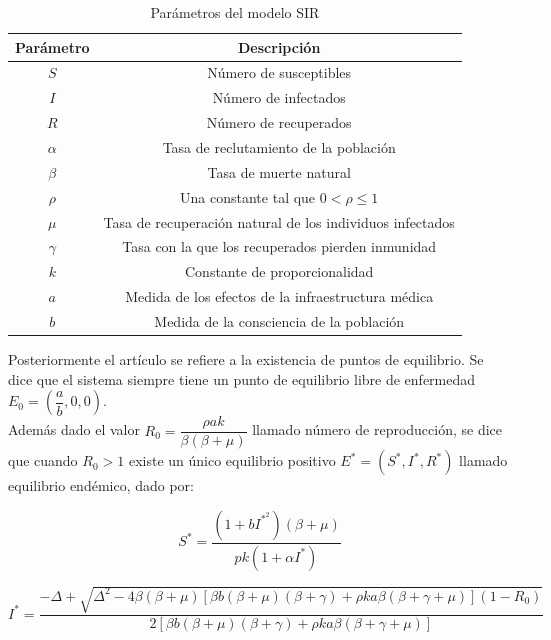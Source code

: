 \documentclass{article}
\begin{document}
\begin{table}[h]
    \centering
    \begin{tabular}{|c|c|}
        \hline
        \textbf{Parámetro} & \textbf{Descripción} \\ \hline
        $S$ & Número de susceptibles \\ \hline
        $I$ & Número de infectados \\ \hline
        $R$ & Número de recuperados \\ \hline
        $\alpha$ & Tasa de reclutamiento de la poblaci\'on \\ \hline
        $\beta$ & Tasa de muerte natural \\ \hline
        $\rho$ & Una constante tal que $0 < \rho \leq 1$ \\ \hline
        $\mu$ & Tasa de recuperaci\'on natural de los individuos infectados \\ \hline
        $\gamma$ & Tasa con la que los recuperados pierden inmunidad \\ \hline
        $k$ & Constante de proporcionalidad \\ \hline
        $a$ & Medida de los efectos de la infraestructura m\'edica \\ \hline
        $b$ & Medida de la consciencia de la poblaci\'on \\ \hline
    \end{tabular}
    \caption{Parámetros del modelo SIR}
    \label{tab:my_label}
\end{table}

Posteriormente el art\'iculo se refiere a la existencia de puntos de equilibrio. Se dice que el sistema siempre tiene un punto de equilibrio libre de enfermedad $E_0 = \left(\dfrac{a}{b}, 0, 0\right)$. \\
Adem\'as dado el valor $R_0 = \dfrac{\rho ak}{\beta (\beta + \mu)}$ llamado n\'umero de reproducci\'on, se dice que cuando $R_0 > 1$ existe un \'unico equilibrio positivo $E^*=(S^*, I^*, R^*)$ llamado equilibrio end\'emico, dado por:

\begin{equation}
    S^* = \dfrac{(1 + bI^{{*}^2})(\beta + \mu)}{pk(1+\alpha I^*)}
\end{equation}

\begin{equation}
    I^* = \dfrac{-\Delta + \sqrt{\Delta ^ 2 - 4\beta (\beta + \mu)[\beta b(\beta + \mu)(\beta + \gamma) + \rho ka\beta (\beta + \gamma + \mu)](1-R_0)}}{2[\beta b(\beta + \mu)(\beta + \gamma) + \rho ka\beta (\beta + \gamma + \mu)]}
\end{equation}
\end{document}
